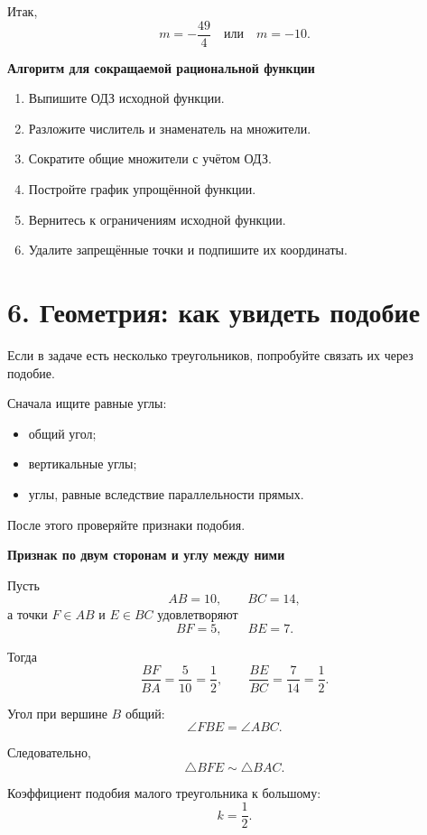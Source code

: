 \documentclass[a4paper,12pt]{article}
\newcommand{\keyidea}[1]{%
    \medskip
    {\color{darkaccent}\bfseries #1}
    \smallskip
}
\begin{document}
Итак,
\[
\boxed{
m=-\frac{49}{4}
\quad\text{или}\quad
m=-10
}.
\]

\keyidea{Алгоритм для сокращаемой рациональной функции}

\begin{enumerate}
    \item Выпишите ОДЗ исходной функции.
    \item Разложите числитель и знаменатель на множители.
    \item Сократите общие множители с учётом ОДЗ.
    \item Постройте график упрощённой функции.
    \item Вернитесь к ограничениям исходной функции.
    \item Удалите запрещённые точки и подпишите их координаты.
\end{enumerate}


\section*{\color{darkaccent}
6. Геометрия: как увидеть подобие
}

Если в задаче есть несколько треугольников,
попробуйте связать их через подобие.

Сначала ищите равные углы:

\begin{itemize}
    \item общий угол;
    \item вертикальные углы;
    \item углы, равные вследствие параллельности прямых.
\end{itemize}

После этого проверяйте признаки подобия.

\keyidea{Признак по двум сторонам и углу между ними}

Пусть
\[
AB=10,\qquad BC=14,
\]
а точки \(F\in AB\) и \(E\in BC\) удовлетворяют
\[
BF=5,\qquad BE=7.
\]

Тогда
\[
\frac{BF}{BA}
=
\frac{5}{10}
=
\frac12,
\qquad
\frac{BE}{BC}
=
\frac{7}{14}
=
\frac12.
\]

Угол при вершине \(B\) общий:
\[
\angle FBE=\angle ABC.
\]

Следовательно,
\[
\triangle BFE\sim\triangle BAC.
\]

Коэффициент подобия малого треугольника к большому:
\[
k=\frac12.
\]
\end{document}
